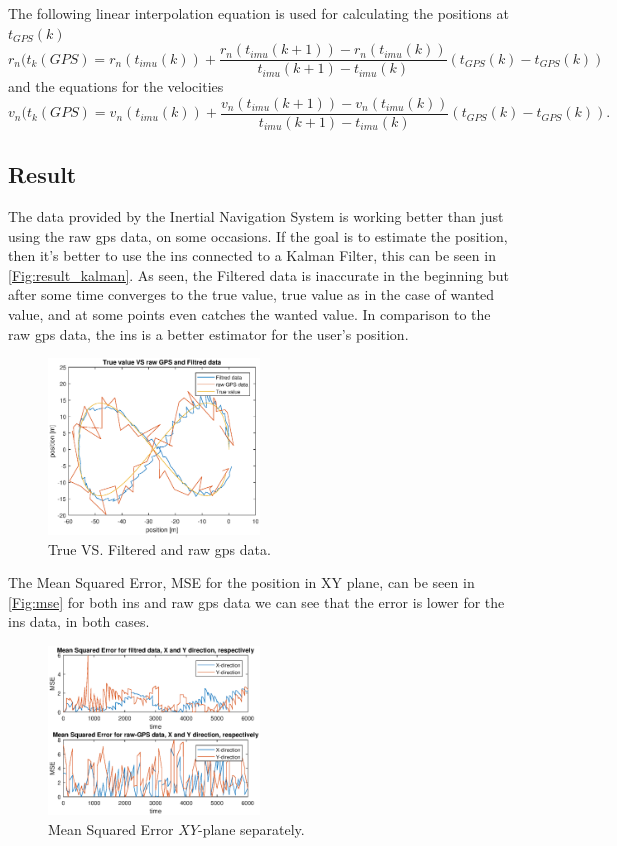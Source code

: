 The following linear interpolation equation is used for calculating the positions at $t_{GPS}(k)$
\begin{equation}
r_n(t_k(GPS) = r_n(t_{imu}(k)) + \frac{r_n(t_{imu}(k+1))-r_n(t_{imu}(k))}{t_{imu}(k+1)-t_{imu}(k)}(t_{GPS}(k)-t_{GPS}(k))
\end{equation}
 and the equations for the velocities 
 \begin{equation}
v_n(t_k(GPS) = v_n(t_{imu}(k)) + \frac{v_n(t_{imu}(k+1))-v_n(t_{imu}(k))}{t_{imu}(k+1)-t_{imu}(k)}(t_{GPS}(k)-t_{GPS}(k)).
\end{equation}
\subsection{Result}
The data provided by the Inertial Navigation System is working better than just using the raw \gls{gps} data, on some occasions. If the goal is to estimate the position, then it's better to use the \gls{ins} connected to a Kalman Filter, this can be seen in \autoref{Fig:result_kalman}. As seen, the Filtered data is inaccurate in the beginning but after some time converges to the true value, true value as in the case of wanted value, and at some points even catches the wanted value. In comparison to the raw \gls{gps} data, the \gls{ins} is a better estimator for the user's position.
\begin{figure}[H]
\centering
\includegraphics[width=0.5\textwidth]{result.eps}
\caption{True VS. Filtered and raw \gls{gps} data.}
\label{Fig:result_kalman}
\end{figure}



The Mean Squared Error, MSE for the position in XY plane, can be seen in \autoref{Fig:mse} for both \gls{ins} and raw \gls{gps} data we can see that the error is lower for the \gls{ins} data, in both cases. 
\begin{figure}[H]
\centering
\includegraphics[width=0.5\textwidth]{mse.eps}
\caption{Mean Squared Error $XY$-plane separately.}
\label{Fig:mse}
\end{figure}

